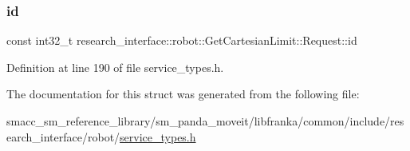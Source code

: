 \subsubsection{\texorpdfstring{id}{id}}
{\footnotesize\ttfamily const int32\+\_\+t research\+\_\+interface\+::robot\+::\+Get\+Cartesian\+Limit\+::\+Request\+::id}



Definition at line 190 of file service\+\_\+types.\+h.



The documentation for this struct was generated from the following file\+:\begin{DoxyCompactItemize}
\item 
smacc\+\_\+sm\+\_\+reference\+\_\+library/sm\+\_\+panda\+\_\+moveit/libfranka/common/include/research\+\_\+interface/robot/\hyperlink{service__types_8h}{service\+\_\+types.\+h}\end{DoxyCompactItemize}
